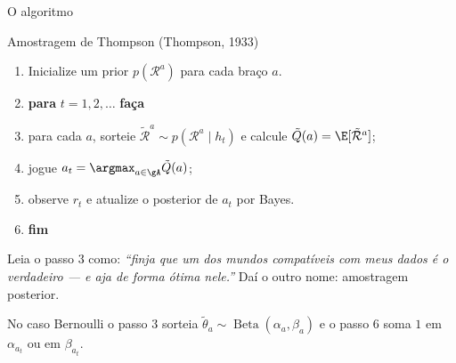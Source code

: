 \documentclass[aspectratio=169, 11pt]{beamer}
\newcommand{\Bdist}{\operatorname{Beta}}
\newcommand{\hist}{h_t}
\begin{document}
\begin{frame}{O algoritmo}
  \begin{algbox}{Amostragem de Thompson (Thompson, 1933)}
    \begin{enumerate}\setlength{\itemsep}{0.15ex}
      \item Inicialize um prior $p(\mathcal{R}^a)$ para cada braço $a$.
      \item \textbf{para} $t = 1, 2, \ldots$ \textbf{faça}
      \item \quad para cada $a$, \alert{sorteie}
            $\tilde{\mathcal{R}}^a \sim p(\mathcal{R}^a \mid \hist)$
            e calcule $\tilde{Q}(a) = \E[\tilde{\mathcal{R}}^a]$;
      \item \quad jogue $a_t = \argmax_{a \in \gA} \tilde{Q}(a)$;
      \item \quad observe $r_t$ e atualize o posterior de $a_t$ por Bayes.
      \item \textbf{fim}
    \end{enumerate}
  \end{algbox}

  \begin{ideiabox}
    Leia o passo 3 como: \emph{``finja que um dos mundos compatíveis com
    meus dados é o verdadeiro — e aja de forma ótima nele.''} Daí o outro
    nome: \alert{amostragem posterior}.
  \end{ideiabox}

  \smallskip
  {\small\color{rlCinza} No caso Bernoulli o passo 3 sorteia
  $\tilde\theta_a \sim \Bdist(\alpha_a, \beta_a)$ e o passo 6 soma $1$ em
  $\alpha_{a_t}$ ou em $\beta_{a_t}$.}
\end{frame}
\end{document}
